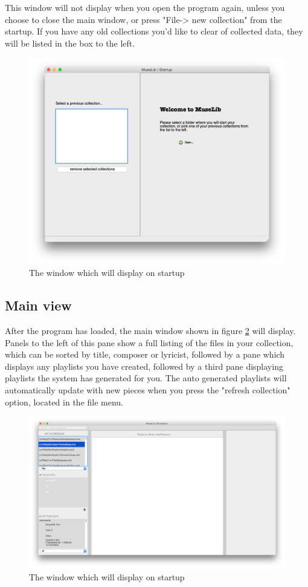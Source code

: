 This window will not display when you open the program again, unless you choose to close the main window, or press "File-> new collection" from the startup. If you have any old collections you'd like to clear of collected data, they will be listed in the box to the left.
\begin{figure}[H]
\centering
\includegraphics[width=400pt]{startup}
\caption{The window which will display on startup}
\label{fig:startup}	
\end{figure}

\subsection{Main view}
After the program has loaded, the main window shown in figure \ref{fig:main} will display. Panels to the left of this pane show a full listing of the files in your collection, which can be sorted by title, composer or lyricist, followed by a pane which displays any playlists you have created, followed by a third pane displaying playlists the system has generated for you. The auto generated playlists will automatically update with new pieces when you press the "refresh collection" option, located in the file menu.
\begin{figure}[H]
\centering
\includegraphics[width=500pt]{main_screenshot}
\caption{The window which will display on startup}
\label{fig:main}	
\end{figure}
